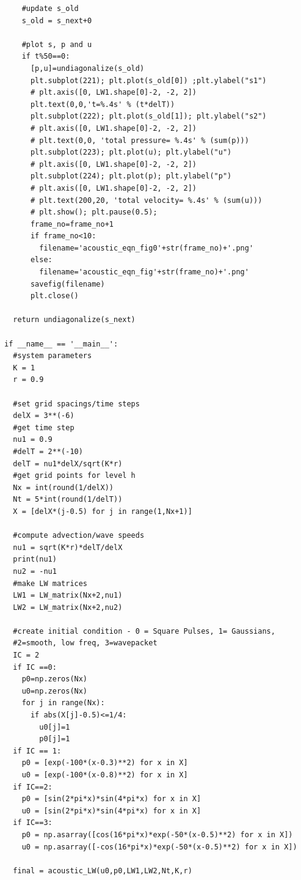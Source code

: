 \documentclass[12pt]{article}
\begin{document}
\begin{verbatim}
    #update s_old
    s_old = s_next+0

    #plot s, p and u
    if t%50==0:
      [p,u]=undiagonalize(s_old)
      plt.subplot(221); plt.plot(s_old[0]) ;plt.ylabel("s1")
      # plt.axis([0, LW1.shape[0]-2, -2, 2])
      plt.text(0,0,'t=%.4s' % (t*delT))
      plt.subplot(222); plt.plot(s_old[1]); plt.ylabel("s2")
      # plt.axis([0, LW1.shape[0]-2, -2, 2])
      # plt.text(0,0, 'total pressure= %.4s' % (sum(p)))
      plt.subplot(223); plt.plot(u); plt.ylabel("u")
      # plt.axis([0, LW1.shape[0]-2, -2, 2])
      plt.subplot(224); plt.plot(p); plt.ylabel("p")
      # plt.axis([0, LW1.shape[0]-2, -2, 2])
      # plt.text(200,20, 'total velocity= %.4s' % (sum(u)))
      # plt.show(); plt.pause(0.5);
      frame_no=frame_no+1
      if frame_no<10:
        filename='acoustic_eqn_fig0'+str(frame_no)+'.png'
      else:
        filename='acoustic_eqn_fig'+str(frame_no)+'.png'
      savefig(filename)
      plt.close()

  return undiagonalize(s_next)

if __name__ == '__main__':
  #system parameters
  K = 1
  r = 0.9

  #set grid spacings/time steps
  delX = 3**(-6)
  #get time step
  nu1 = 0.9
  #delT = 2**(-10)
  delT = nu1*delX/sqrt(K*r)
  #get grid points for level h
  Nx = int(round(1/delX))
  Nt = 5*int(round(1/delT))
  X = [delX*(j-0.5) for j in range(1,Nx+1)]

  #compute advection/wave speeds
  nu1 = sqrt(K*r)*delT/delX
  print(nu1)
  nu2 = -nu1
  #make LW matrices
  LW1 = LW_matrix(Nx+2,nu1)
  LW2 = LW_matrix(Nx+2,nu2)

  #create initial condition - 0 = Square Pulses, 1= Gaussians, 
  #2=smooth, low freq, 3=wavepacket
  IC = 2
  if IC ==0:
    p0=np.zeros(Nx)
    u0=np.zeros(Nx)
    for j in range(Nx):
      if abs(X[j]-0.5)<=1/4:
        u0[j]=1
        p0[j]=1
  if IC == 1:
    p0 = [exp(-100*(x-0.3)**2) for x in X]
    u0 = [exp(-100*(x-0.8)**2) for x in X]
  if IC==2:
    p0 = [sin(2*pi*x)*sin(4*pi*x) for x in X]
    u0 = [sin(2*pi*x)*sin(4*pi*x) for x in X]
  if IC==3:
    p0 = np.asarray([cos(16*pi*x)*exp(-50*(x-0.5)**2) for x in X])  
    u0 = np.asarray([-cos(16*pi*x)*exp(-50*(x-0.5)**2) for x in X])

  final = acoustic_LW(u0,p0,LW1,LW2,Nt,K,r)

\end{verbatim}
\end{document}
